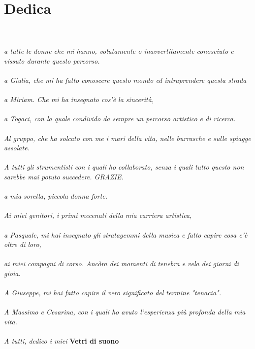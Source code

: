 
\chapter*{Dedica}


\textit{
\\
\\
a tutte le donne che mi hanno, volutamente o inavvertitamente conosciuto e vissuto durante questo percorso. \\
\\
a Giulia, che mi ha fatto conoscere questo mondo ed intraprendere questa strada \\
\\
a Miriam. Che mi ha insegnato cos'è la sincerità,\\
\\
a Togaci, con la quale condivido da sempre un percorso artistico e di ricerca. \\
\\
Al gruppo, che ha solcato con me i mari della vita, nelle burrasche e sulle spiagge assolate. \\
\\
A tutti gli strumentisti con i quali ho collaborato, senza i quali tutto questo non sarebbe mai potuto succedere. GRAZIE. \\
\\
a mia sorella, piccola donna forte. \\
\\
Ai miei genitori, i primi mecenati della mia carriera artistica, \\
\\
a Pasquale, mi hai insegnato gli stratagemmi della musica e fatto capire cosa c'è oltre di loro, \\
\\
ai miei compagni di corso. Ancòra dei momenti di tenebra e vela dei giorni di gioia. \\
\\
A Giuseppe, mi hai fatto capire il vero significato del termine "tenacia". \\
\\
A Massimo e Cesarina, con i quali ho avuto l'esperienza più profonda della mia vita. \\
\\
A tutti, dedico i miei} \textbf{Vetri di suono} \\
\\